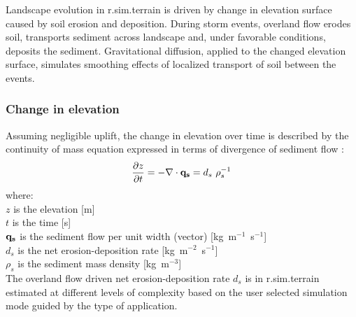 \documentclass[gmd, manuscript]{copernicus}
\begin{document}
Landscape evolution in r.sim.terrain 
is driven by change in elevation surface caused by soil erosion and deposition.
During storm events, overland flow erodes soil, transports sediment across landscape and, 
under favorable conditions, deposits the sediment. Gravitational diffusion, applied to the changed elevation
surface, simulates smoothing effects of localized transport of soil between the events.

\subsubsection{Change in elevation} 

Assuming negligible uplift, the change in elevation over time 
is described by the continuity of mass equation expressed in terms of divergence 
of sediment flow  \citep{Tucker2001}:
\begin{equation}
\label{eq:evolution} 
{\partial z \over \partial t } = -\nabla \cdot {\bf q_s} = d_s ~ \rho_s^{-1} 
\end{equation}
{\small
where: \\
\noindent
\hspace*{0.5em} $z$ is the elevation [\unit{m}] \\
\hspace*{0.5em} $t$ is the time [\unit{s}] \\
\hspace*{0.5em} ${\bf q_s}$ is the sediment flow per unit width (vector) [\unit{kg~m}$^{-1}$~\unit{s}$^{-1}$]\\
\hspace*{0.5em} $d_s$ is the net erosion-deposition rate [\unit{kg~m}$^{-2}$~\unit{s}$^{-1}$]\\
\hspace*{0.5em} $\rho_s$ is the sediment mass density [\unit{kg~m}$^{-3}$]\\
}
The overland flow driven net erosion-deposition rate $d_s$ 
 is in r.sim.terrain estimated at different levels of complexity based 
on the user selected simulation mode guided by the type of application.
\end{document}
